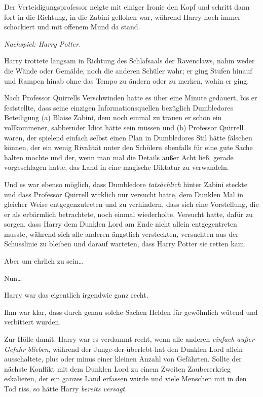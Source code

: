 {Der Verteidigungsprofessor neigte mit einiger Ironie den Kopf und schritt dann fort in die Richtung, in die Zabini geflohen war, während Harry noch immer schockiert und mit offenem Mund da stand.

\later

\emph{Nachspiel: Harry Potter.}

Harry trottete langsam in Richtung des Schlafsaals der Ravenclaws, nahm weder die Wände oder Gemälde, noch die anderen Schüler wahr; er ging Stufen hinauf und Rampen hinab ohne das Tempo zu ändern oder zu merken, wohin er ging.

Nach Professor Quirrells Verschwinden hatte es über eine Minute gedauert, bis er feststellte, dass seine einzigen Informationsquellen bezüglich Dumbledores Beteiligung (a) Blaise Zabini, dem noch einmal zu trauen er schon ein vollkommener, sabbernder Idiot hätte sein müssen und (b) Professor Quirrell waren, der spielend einfach selbst einen Plan in Dumbledores Stil hätte fälschen können, der ein wenig Rivalität unter den Schülern ebenfalls für eine gute Sache halten mochte und der, wenn man mal die Details außer Acht ließ, gerade vorgeschlagen hatte, das Land in eine magische Diktatur zu verwandeln.

Und es war ebenso möglich, dass Dumbledore \emph{tatsächlich} hinter Zabini steckte und dass Professor Quirrell wirklich nur versucht hatte, dem Dunklen Mal in gleicher Weise entgegenzutreten und zu verhindern, dass sich eine Vorstellung, die er als erbärmlich betrachtete, noch einmal wiederholte. Versucht hatte, dafür zu sorgen, dass Harry dem Dunklen Lord am Ende nicht allein entgegentreten musste, während sich alle anderen ängstlich versteckten, versuchten aus der Schusslinie zu bleiben und darauf warteten, dass Harry Potter sie retten kam.

Aber um ehrlich zu sein…

Nun…

Harry war das eigentlich irgendwie ganz recht.

Ihm war klar, dass durch genau solche Sachen Helden für gewöhnlich wütend und verbittert wurden.

Zur Hölle damit. Harry war es verdammt recht, wenn alle anderen \emph{einfach} \emph{außer Gefahr blieben}, während der Junge-der-überlebt-hat den Dunklen Lord allein ausschaltete, plus oder minus einer kleinen Anzahl von Gefährten. Sollte der nächste Konflikt mit dem Dunklen Lord zu einem Zweiten Zaubererkrieg eskalieren, der ein ganzes Land erfassen würde und viele Menschen mit in den Tod riss, so hätte Harry \emph{bereits versagt.}

}
